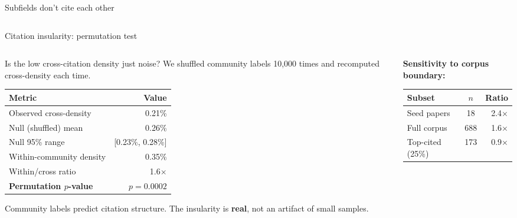 \documentclass[aspectratio=169,11pt]{beamer}
\begin{document}
\begin{frame}{Subfields don't cite each other}
\begin{columns}[T]
\begin{column}{0.42\textwidth}
\end{column}
\end{columns}
\end{frame}

\begin{frame}[label=citationtest]{Citation insularity: permutation test}
\begin{columns}[T]
\begin{column}{0.48\textwidth}
{\small Is the low cross-citation density just noise? We shuffled community labels 10,000 times and recomputed cross-density each time.}

\vspace{0.5em}

{\scriptsize
\begin{tabular}{lr}
\toprule
\textbf{Metric} & \textbf{Value} \\
\midrule
Observed cross-density & 0.21\% \\
Null (shuffled) mean & 0.26\% \\
Null 95\% range & [0.23\%, 0.28\%] \\
Within-community density & 0.35\% \\
Within/cross ratio & 1.6$\times$ \\
\midrule
\textbf{Permutation $p$-value} & \textbf{$p = 0.0002$} \\
\bottomrule
\end{tabular}
}

\vspace{0.5em}
{\small Community labels predict citation structure. The insularity is \textbf{real}, not an artifact of small samples.}
\end{column}
\begin{column}{0.49\textwidth}
\vspace{0.5em}

\centering
{\small \textbf{Sensitivity to corpus boundary:}}

\vspace{0.3em}
{\scriptsize
\begin{tabular}{lcr}
\toprule
\textbf{Subset} & \textbf{$n$} & \textbf{Ratio} \\
\midrule
Seed papers & 18 & 2.4$\times$ \\
Full corpus & 688 & 1.6$\times$ \\
Top-cited (25\%) & 173 & 0.9$\times$ \\
\bottomrule
\end{tabular}
}


\end{column}
\end{columns}
\end{frame}
\end{document}
